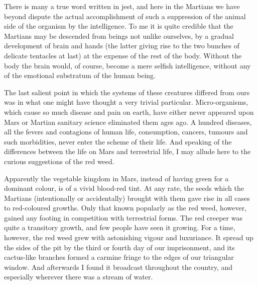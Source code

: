 There is many a true word written in jest, and here in the Martians
we have beyond dispute the actual accomplishment of such a
suppression of the animal side of the organism by the intelligence.
To me it is quite credible that the Martians may be descended from
beings not unlike ourselves, by a gradual development of brain and
hands (the latter giving rise to the two bunches of delicate
tentacles at last) at the expense of the rest of the body. Without
the body the brain would, of course, become a mere selfish
intelligence, without any of the emotional substratum of the human
being.

The last salient point in which the systems of these creatures
differed from ours was in what one might have thought a very
trivial particular. Micro-organisms, which cause so much disease
and pain on earth, have either never appeared upon Mars or Martian
sanitary science eliminated them ages ago. A hundred diseases, all
the fevers and contagions of human life, consumption, cancers,
tumours and such morbidities, never enter the scheme of their life.
And speaking of the differences between the life on Mars and
terrestrial life, I may allude here to the curious suggestions of
the red weed.

Apparently the vegetable kingdom in Mars, instead of having green
for a dominant colour, is of a vivid blood-red tint. At any rate,
the seeds which the Martians (intentionally or accidentally)
brought with them gave rise in all cases to red-coloured growths.
Only that known popularly as the red weed, however, gained any
footing in competition with terrestrial forms. The red creeper was
quite a transitory growth, and few people have seen it growing. For
a time, however, the red weed grew with astonishing vigour and
luxuriance. It spread up the sides of the pit by the third or
fourth day of our imprisonment, and its cactus-like branches formed
a carmine fringe to the edges of our triangular window. And
afterwards I found it broadcast throughout the country, and
especially wherever there was a stream of water.

